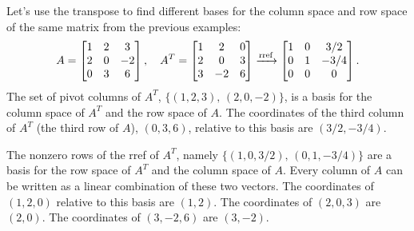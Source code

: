 \begin{example}\label{colspace2ex}
Let's use the transpose to find different bases for the column space and row space of the same matrix from the previous examples:  
$$
A=
\begin{bmatrix}
\begin{matrix} 1\\2\\0 \end{matrix}
&\begin{matrix} 2\\0\\3 \end{matrix}
&\begin{matrix} 3\\-2\\6 \end{matrix}
\end{bmatrix},\quad
A^T
=
\begin{bmatrix}
 1 & 2 & 0 \\
 2 & 0 & 3 \\
 3 & -2 & 6
\end{bmatrix}
\xrightarrow{\operatorname{rref}}
\begin{bmatrix}
 1 & 0 & {3}/{2} \\
 0 & 1 & -{3}/{4} \\
 0 & 0 & 0
\end{bmatrix}.
$$
%
The set of pivot columns of $A^T$, $\{(1,2,3),\, (2,0,-2)\}$, is a basis for the column space of $A^T$ and the row space of $A$.
The coordinates of the third column of $A^T$ (the third row of $A$), $(0,3,6)$, relative to this basis are $(3/2,-3/4)$. 

The nonzero rows of the rref of $A^T$, namely $\{(1,0,3/2),\, (0,1,-3/4)\}$ are a basis for the row space of $A^T$ and the column space of $A$.  Every column of $A$ can be written as a linear combination of these two vectors. The coordinates of $(1,2,0)$ relative to this basis are $(1,2)$. The coordinates of $(2,0,3)$ are $(2,0)$. The coordinates of $(3,-2,6)$ are $(3,-2)$.
\end{example}

